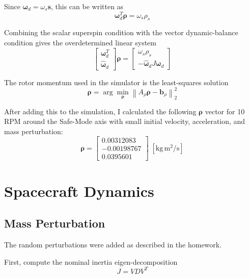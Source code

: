 \documentclass[conference,onecolumn,draftclsnofoot]{IEEEtran}
\begin{document}
Since $\boldsymbol{\omega}_d=\omega_s\mathbf{s}$, this can be written as
\begin{equation}
\boldsymbol{\omega}_d^T\boldsymbol{\rho}
=
\omega_s\rho_s
\end{equation}

Combining the scalar superspin condition with the vector dynamic-balance
condition gives the overdetermined linear system
\begin{equation}
\begin{bmatrix}
\boldsymbol{\omega}_d^T\\
\boldsymbol{\hat{\omega}}_d
\end{bmatrix}
\boldsymbol{\rho}
=
\begin{bmatrix}
\omega_s\rho_s\\
-\boldsymbol{\hat{\omega}}_d J\boldsymbol{\omega}_d
\end{bmatrix}
\end{equation}

The rotor momentum used in the simulator is the least-squares solution
\begin{equation}
\boldsymbol{\rho}
=
\arg\min_{\boldsymbol{\rho}}
\left\|
A_{\rho}\boldsymbol{\rho}
-
\mathbf{b}_{\rho}
\right\|_2^2 
\end{equation}

After adding this to the simulation, I calculated the following $\boldsymbol{\rho}$ vector for 10 RPM around the Safe-Mode axis with small initial velocity, acceleration, and mass perturbation:
\begin{equation}
\boxed{
\boldsymbol{\rho} =
\begin{bmatrix}
0.00312083 \\
-0.00198767 \\
0.0395601
\end{bmatrix}\;[\mathrm{kg\,m^2/s}]
}
\end{equation}

\clearpage
\section{Spacecraft Dynamics}
\subsection{Mass Perturbation}
The random perturbations were added as described in the homework.

First, compute the nominal inertia eigen-decomposition
\begin{equation}
J = VDV^T
\end{equation}
\end{document}
